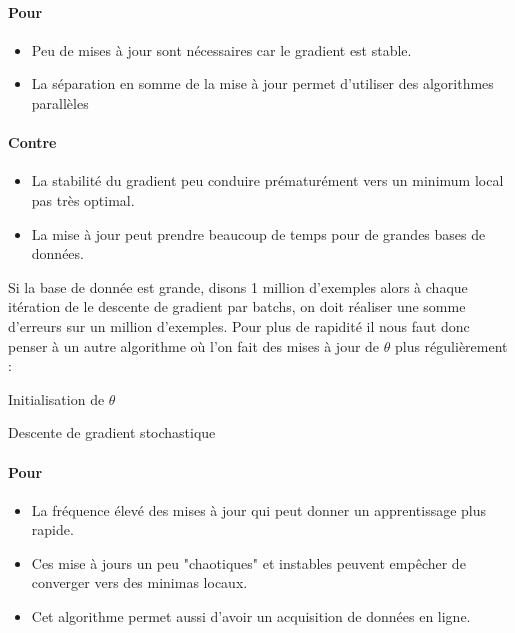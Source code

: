 \paragraph{Pour}
\begin{itemize}
	\item Peu de mises à jour sont nécessaires car le gradient est stable.
	\item La séparation en somme de la mise à jour permet d'utiliser des algorithmes parallèles
\end{itemize}
\paragraph{Contre}
\begin{itemize}
	\item La stabilité du gradient peu conduire prématurément vers un minimum local pas très optimal.
	\item La mise à jour peut prendre beaucoup de temps pour de grandes bases de données.
\end{itemize}


Si la base de donnée est grande, disons 1 million d'exemples alors à chaque itération de le descente de gradient par batchs, on doit réaliser une somme d'erreurs sur un million d'exemples. Pour plus de rapidité il nous faut donc penser à un autre algorithme où l'on fait des mises à jour de $\theta$ plus régulièrement :

\begin{center}
	\begin{algorithm}[H]
		Initialisation de $\theta$\;
		\caption{Descente de gradient stochastique}
	\end{algorithm}
\end{center}

\paragraph{Pour}
\begin{itemize}
	\item La fréquence élevé des mises à jour qui peut donner un apprentissage plus rapide.
	\item Ces mise à jours un peu "chaotiques" et instables peuvent empêcher de converger vers des minimas locaux.
	\item Cet algorithme permet aussi d'avoir un acquisition de données en ligne.
\end{itemize}
